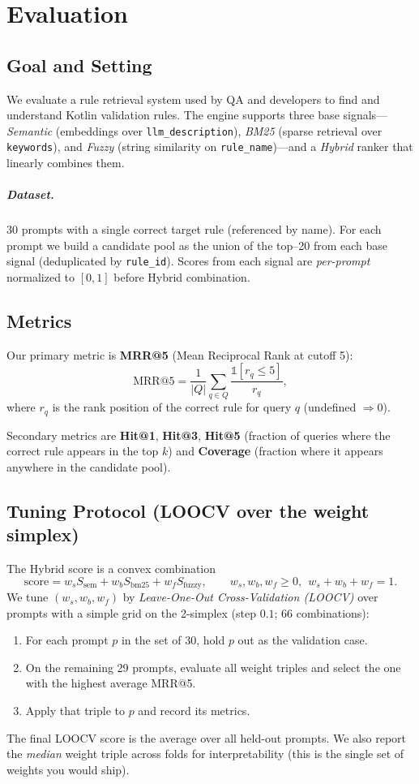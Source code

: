 \chapter{Evaluation}
\label{chap:evaluation}

\section{Goal and Setting}
We evaluate a rule retrieval system used by QA and developers to find and understand Kotlin validation rules. The engine supports three base signals—\emph{Semantic} (embeddings over \texttt{llm\_description}), \emph{BM25} (sparse retrieval over \texttt{keywords}), and \emph{Fuzzy} (string similarity on \texttt{rule\_name})—and a \emph{Hybrid} ranker that linearly combines them.

\paragraph{Dataset.} 30 prompts with a single correct target rule (referenced by name). For each prompt we build a candidate pool as the union of the top–20 from each base signal (deduplicated by \texttt{rule\_id}). Scores from each signal are \emph{per-prompt} normalized to $[0,1]$ before Hybrid combination.

\section{Metrics}
Our primary metric is \textbf{MRR@5} (Mean Reciprocal Rank at cutoff 5):
\[
\mathrm{MRR@5}=\frac{1}{|Q|}\sum_{q\in Q} \frac{\mathbb{1}[r_q\le 5]}{r_q},
\]
where $r_q$ is the rank position of the correct rule for query $q$ (undefined $\Rightarrow 0$).

Secondary metrics are \textbf{Hit@1}, \textbf{Hit@3}, \textbf{Hit@5} (fraction of queries where the correct rule appears in the top $k$) and \textbf{Coverage} (fraction where it appears anywhere in the candidate pool).

\section{Tuning Protocol (LOOCV over the weight simplex)}
The Hybrid score is a convex combination
\[
\text{score} = w_s S_{\text{sem}} + w_b S_{\text{bm25}} + w_f S_{\text{fuzzy}},
\qquad w_s,w_b,w_f\ge 0,\ \ w_s+w_b+w_f=1.
\]
We tune $(w_s,w_b,w_f)$ by \emph{Leave-One-Out Cross-Validation (LOOCV)} over prompts with a simple grid on the 2-simplex (step $0.1$; 66 combinations):
\begin{enumerate}
  \item For each prompt $p$ in the set of 30, hold $p$ out as the validation case.
  \item On the remaining 29 prompts, evaluate all weight triples and select the one with the highest average MRR@5.
  \item Apply that triple to $p$ and record its metrics.
\end{enumerate}
The final LOOCV score is the average over all held-out prompts. We also report the \emph{median} weight triple across folds for interpretability (this is the single set of weights you would ship).

